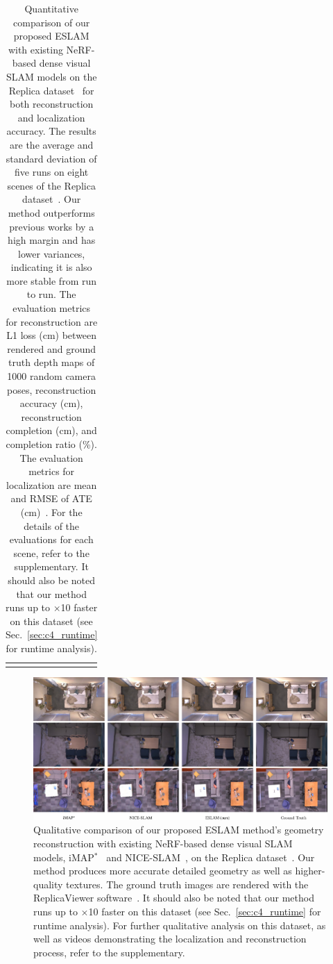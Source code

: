 \begin{table}[t]
\begin{center}
\begin{tabular}{l|cccc}
            \Xhline{2\arrayrulewidth}
        \end{tabular}
    \end{center}
    \caption{Quantitative comparison of our proposed ESLAM with existing NeRF-based dense visual SLAM models on the Replica dataset~\cite{replica19arxiv} for both reconstruction and localization accuracy. The results are the average and standard deviation of five runs on eight scenes of the Replica dataset~\cite{replica19arxiv}. Our method outperforms previous works by a high margin and has lower variances, indicating it is also more stable from run to run. The evaluation metrics for reconstruction are L1 loss (cm) between rendered and ground truth depth maps of 1000 random camera poses, reconstruction accuracy (cm), reconstruction completion (cm), and completion ratio (\%). The evaluation metrics for localization are mean and RMSE of ATE (cm)~\cite{sturm2012benchmark}. For the details of the evaluations for each scene, refer to the supplementary. It should also be noted that our method runs up to $\times$10 faster on this dataset (see Sec.~\ref{sec:c4_runtime} for runtime analysis).}
    \label{table:quantitative_replica}
\end{table}

\begin{figure}[t]
    \begin{center}
        \includegraphics[width=0.99\linewidth]{images/chapter4/figures/Fig3.jpg}
    \end{center}
    \caption{Qualitative comparison of our proposed ESLAM method's geometry reconstruction with existing NeRF-based dense visual SLAM models, iMAP$^*$~\cite{sucar2021imap} and NICE-SLAM~\cite{zhu2022nice}, on the Replica dataset~\cite{replica19arxiv}. Our method produces more accurate detailed geometry as well as higher-quality textures. The ground truth images are rendered with the ReplicaViewer software~\cite{replica19arxiv}. It should also be noted that our method runs up to $\times$10 faster on this dataset (see Sec.~\ref{sec:c4_runtime} for runtime analysis). For further qualitative analysis on this dataset, as well as videos demonstrating the localization and reconstruction process, refer to the supplementary.}
    \label{fig:c4_qualitative_replica}
\end{figure}

